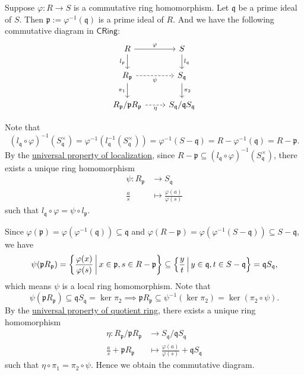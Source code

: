 \begin{proposition}{}{}
    Suppose $\varphi: R\to S$ is a commutative ring homomorphism. Let $\mathfrak{q}$ be a prime ideal of $S$. Then $\mathfrak{p}:=\varphi^{-1}(\mathfrak{q})$ is a prime ideal of $R$. And we have the following commutative diagram in $\mathsf{CRing}$:
    \[
        \begin{tikzcd}
            R \arrow[r, "\varphi"] \arrow[d, "l_\mathfrak{p}"']                  & S \arrow[d, "l_\mathfrak{q}"]                  \\
            R_\mathfrak{p} \arrow[r, "\psi"', dashed] \arrow[d, "\pi_1"']        & S_{\mathfrak{q}} \arrow[d, "\pi_2"]            \\
            R_\mathfrak{p}/\mathfrak{p}R_\mathfrak{p} \arrow[r, "\eta"', dashed] & S_{\mathfrak{q}}/\mathfrak{q} S_{\mathfrak{q}}
            \end{tikzcd}
    \]
\end{proposition}
\begin{prf}
    Note that
    \[
     (l_\mathfrak{q}\circ \varphi)^{-1}(S_{\mathfrak{q}}^\times)=\varphi^{-1}(l_\mathfrak{q}^{-1}(S_{\mathfrak{q}}^\times))=\varphi^{-1}(S-\mathfrak{q})=R-\varphi^{-1}(\mathfrak{q})=R-\mathfrak{p}.
    \]
    By the \hyperref[th:universal_property_of_localization]{universal property of localization}, since $R-\mathfrak{p}\subseteq (l_\mathfrak{q}\circ \varphi)^{-1}(S_{\mathfrak{q}}^\times)$, there exists a unique ring homomorphism 
    \begin{align*}
        \psi:R_\mathfrak{p}&\longrightarrow S_{\mathfrak{q}}\\
        \frac{a}{s}&\longmapsto \frac{\varphi(a)}{\varphi(s)}
    \end{align*}
    such that $l_\mathfrak{q}\circ \varphi=\psi\circ l_\mathfrak{p}$.
    
    Since $\varphi(\mathfrak{p})=\varphi(\varphi^{-1}(\mathfrak{q}))\subseteq\mathfrak{q}$ and $\varphi(R-\mathfrak{p})=\varphi(\varphi^{-1}(S-\mathfrak{q}))\subseteq S-\mathfrak{q}$, we have
    \[
    \psi(\mathfrak{p}R_\mathfrak{p})=\left\{\frac{\varphi(x)}{\varphi(s)}\,\middle\vert\, x\in \mathfrak{p}, s\in R-\mathfrak{p}\right\}\subseteq\left\{\frac{y}{t}\,\middle\vert\, y\in \mathfrak{q}, t\in S-\mathfrak{q}\right\}=\mathfrak{q}S_{\mathfrak{q}} ,
    \]
    which means $\psi$ is a local ring homomorphism. Note that
    \[
        \psi(\mathfrak{p}R_\mathfrak{p})\subseteq \mathfrak{q}S_{\mathfrak{q}}=\ker \pi_2\implies \mathfrak{p}R_\mathfrak{p}\subseteq \psi^{-1}(\ker \pi_2)=\ker (\pi_2\circ \psi).
    \]
    By the \hyperref[th:universal_property_of_quotient_ring]{universal property of quotient ring}, there exists a unique ring homomorphism
    \begin{align*}
        \eta:R_\mathfrak{p}/\mathfrak{p}R_\mathfrak{p}&\longrightarrow S_{\mathfrak{q}}/\mathfrak{q}S_{\mathfrak{q}}\\
        \frac{a}{s}+\mathfrak{p}R_\mathfrak{p}&\longmapsto \frac{\varphi(a)}{\varphi(s)}+\mathfrak{q}S_{\mathfrak{q}}
    \end{align*}
    such that $\eta\circ \pi_1=\pi_2\circ \psi$. Hence we obtain the commutative diagram.
\end{prf}


